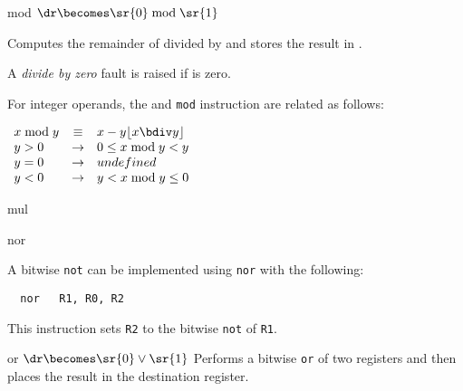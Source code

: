 \begin{instruction}{mod}\label{inst:mod}
     {\amodopc}
     {$\dr \becomes \sr{0} \bmod \sr{1}$}
     {
       Computes the remainder of  divided by  and stores
       the result in \dr.

       A \emph{divide by zero} fault is raised if  is zero.

       For integer operands, the  and \texttt{mod}
       instruction are related as follows:

       \begin{math}
         \begin{array}{lcl}
           x \bmod y & \equiv  & x - y \lfloor {x \bdiv y} \rfloor \\
           y > 0 & \rightarrow & 0 \leq x \bmod y < y \\
           y = 0 & \rightarrow & undefined \\
           y < 0 & \rightarrow & y < x \bmod y \leq 0 \\
         \end{array}
       \end{math}
     }
\end{instruction}

\begin{instruction}{mul}
\end{instruction}

\begin{instruction}{nor}

  \begin{xnote}
    A bitwise \texttt{not} can be implemented using \texttt{nor} with
    the following:

\begin{verbatim}
  nor   R1, R0, R2
\end{verbatim}

This instruction sets \texttt{R2} to the bitwise \texttt{not} of
\texttt{R1}.
  \end{xnote}

\end{instruction}


\begin{instruction}{or}
     {\roropc}
     {$\dr \becomes \sr{0} \vee \sr{1}$}
     {
       Performs a bitwise \texttt{or} of two registers and then
       places the result in the destination register.
     }
\end{instruction}


